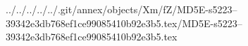 ../../../../../.git/annex/objects/Xm/fZ/MD5E-s5223--39342e3db768ef1ce99085410b92e3b5.tex/MD5E-s5223--39342e3db768ef1ce99085410b92e3b5.tex